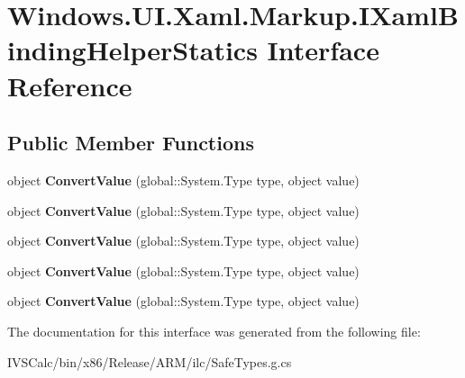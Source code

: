 \hypertarget{interface_windows_1_1_u_i_1_1_xaml_1_1_markup_1_1_i_xaml_binding_helper_statics}{}\section{Windows.\+U\+I.\+Xaml.\+Markup.\+I\+Xaml\+Binding\+Helper\+Statics Interface Reference}
\label{interface_windows_1_1_u_i_1_1_xaml_1_1_markup_1_1_i_xaml_binding_helper_statics}
\subsection*{Public Member Functions}
\begin{DoxyCompactItemize}
\item 
\mbox{\label{interface_windows_1_1_u_i_1_1_xaml_1_1_markup_1_1_i_xaml_binding_helper_statics_af42e91b2d961e4d4759e35f06dbabd8b}} 
object {\bfseries Convert\+Value} (global\+::\+System.\+Type type, object value)
\item 
\mbox{\label{interface_windows_1_1_u_i_1_1_xaml_1_1_markup_1_1_i_xaml_binding_helper_statics_af42e91b2d961e4d4759e35f06dbabd8b}} 
object {\bfseries Convert\+Value} (global\+::\+System.\+Type type, object value)
\item 
\mbox{\label{interface_windows_1_1_u_i_1_1_xaml_1_1_markup_1_1_i_xaml_binding_helper_statics_af42e91b2d961e4d4759e35f06dbabd8b}} 
object {\bfseries Convert\+Value} (global\+::\+System.\+Type type, object value)
\item 
\mbox{\label{interface_windows_1_1_u_i_1_1_xaml_1_1_markup_1_1_i_xaml_binding_helper_statics_af42e91b2d961e4d4759e35f06dbabd8b}} 
object {\bfseries Convert\+Value} (global\+::\+System.\+Type type, object value)
\item 
\mbox{\label{interface_windows_1_1_u_i_1_1_xaml_1_1_markup_1_1_i_xaml_binding_helper_statics_af42e91b2d961e4d4759e35f06dbabd8b}} 
object {\bfseries Convert\+Value} (global\+::\+System.\+Type type, object value)
\end{DoxyCompactItemize}


The documentation for this interface was generated from the following file\+:\begin{DoxyCompactItemize}
\item 
I\+V\+S\+Calc/bin/x86/\+Release/\+A\+R\+M/ilc/Safe\+Types.\+g.\+cs\end{DoxyCompactItemize}
